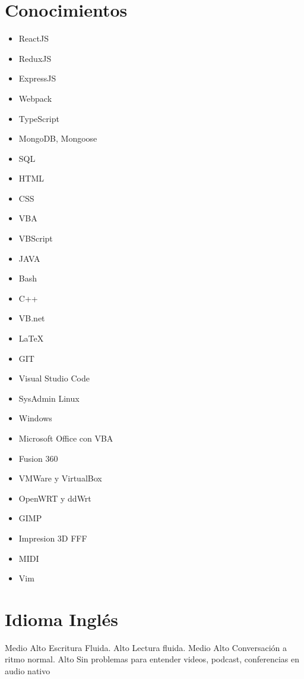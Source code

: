 \documentclass[draft,color,12pt,letterpaper,sans]{moderncv}
\begin{document}
\section{Conocimientos}
\begin{cvcolumns}
	{
		\begin{itemize}
			\item
				ReactJS
			\item
				ReduxJS
			\item
				ExpressJS
			\item
				Webpack
			\item
				TypeScript
			\item
				MongoDB, Mongoose
			\item
				SQL
			\item
				HTML
			\item
				CSS
			\item
				VBA
			\item	
				VBScript
			\item
				JAVA		
			\item
				Bash
			\item
				C++
			\item
				VB.net
			\item
				LaTeX
		\end{itemize}
	}
	

{
	\begin{itemize}
		\item
			GIT
		\item
			Visual Studio Code
		\item
			SysAdmin Linux
		\item
			Windows
		\item
			Microsoft Office con VBA
		\item
			Fusion 360
		\item
			VMWare y VirtualBox
		\item
			OpenWRT y ddWrt
		\item
			GIMP
		\item
			Impresion 3D FFF
		\item
			MIDI
		\item	
			Vim
	\end{itemize}
}

\end{cvcolumns}




\section{Idioma Ingl\'es}
{Medio Alto}
{Escritura Fluida.}
{Alto}
{Lectura fluida.}
{Medio Alto}
{Conversaci\'on a ritmo normal.}
{Alto}
{Sin problemas para entender videos, podcast, conferencias en audio nativo}
\end{document}
